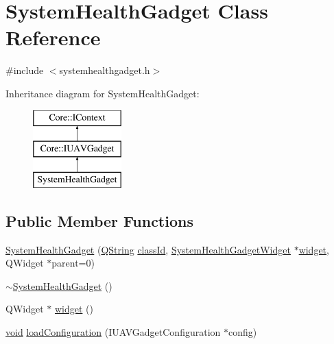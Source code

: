 \hypertarget{class_system_health_gadget}{\section{\-System\-Health\-Gadget \-Class \-Reference}
\label{class_system_health_gadget}
}


{\ttfamily \#include $<$systemhealthgadget.\-h$>$}

\-Inheritance diagram for \-System\-Health\-Gadget\-:\begin{figure}[H]
\begin{center}
\leavevmode
\includegraphics[height=3.000000cm]{class_system_health_gadget}
\end{center}
\end{figure}
\subsection*{\-Public \-Member \-Functions}
\begin{DoxyCompactItemize}
\item 
\hyperlink{group___system_health_plugin_ga87aa19680bf60a11eb4bd50c7df04992}{\-System\-Health\-Gadget} (\hyperlink{group___u_a_v_objects_plugin_gab9d252f49c333c94a72f97ce3105a32d}{\-Q\-String} \hyperlink{group___core_plugin_ga3878fde66a57220608960bcc3fbeef2c}{class\-Id}, \hyperlink{class_system_health_gadget_widget}{\-System\-Health\-Gadget\-Widget} $\ast$\hyperlink{group___system_health_plugin_ga3732714b9995ed833047882c7e723dc0}{widget}, \-Q\-Widget $\ast$parent=0)
\item 
\hyperlink{group___system_health_plugin_ga2212c1f05f7363aaf794f85bb9e7823c}{$\sim$\-System\-Health\-Gadget} ()
\item 
\-Q\-Widget $\ast$ \hyperlink{group___system_health_plugin_ga3732714b9995ed833047882c7e723dc0}{widget} ()
\item 
\hyperlink{group___u_a_v_objects_plugin_ga444cf2ff3f0ecbe028adce838d373f5c}{void} \hyperlink{group___system_health_plugin_gab876671a49f1abc2e7b8edbec5c0eaa1}{load\-Configuration} (\-I\-U\-A\-V\-Gadget\-Configuration $\ast$config)
\end{DoxyCompactItemize}


